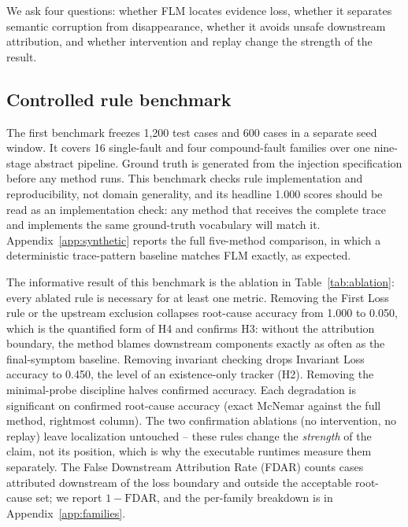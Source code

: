 \documentclass[10pt]{article}
\begin{document}
We ask four questions: whether FLM locates evidence loss, whether it separates semantic corruption from disappearance, whether it avoids unsafe downstream attribution, and whether intervention and replay change the strength of the result.

\subsection{Controlled rule benchmark}
\label{sec:controlled}

The first benchmark freezes 1,200 test cases and 600 cases in a separate seed window. It covers 16 single-fault and four compound-fault families over one nine-stage abstract pipeline. Ground truth is generated from the injection specification before any method runs. This benchmark checks rule implementation and reproducibility, not domain generality, and its headline 1.000 scores should be read as an implementation check: any method that receives the complete trace and implements the same ground-truth vocabulary will match it. Appendix~\ref{app:synthetic} reports the full five-method comparison, in which a deterministic trace-pattern baseline matches FLM exactly, as expected.

The informative result of this benchmark is the ablation in Table~\ref{tab:ablation}: every ablated rule is necessary for at least one metric. Removing the First Loss rule or the upstream exclusion collapses root-cause accuracy from 1.000 to 0.050, which is the quantified form of H4 and confirms H3: without the attribution boundary, the method blames downstream components exactly as often as the final-symptom baseline. Removing invariant checking drops Invariant Loss accuracy to 0.450, the level of an existence-only tracker (H2). Removing the minimal-probe discipline halves confirmed accuracy. Each degradation is significant on confirmed root-cause accuracy (exact McNemar against the full method, rightmost column). The two confirmation ablations (no intervention, no replay) leave localization untouched -- these rules change the \emph{strength} of the claim, not its position, which is why the executable runtimes measure them separately. The False Downstream Attribution Rate (FDAR) counts cases attributed downstream of the loss boundary and outside the acceptable root-cause set; we report $1-\mathrm{FDAR}$, and the per-family breakdown is in Appendix~\ref{app:families}.
\end{document}
